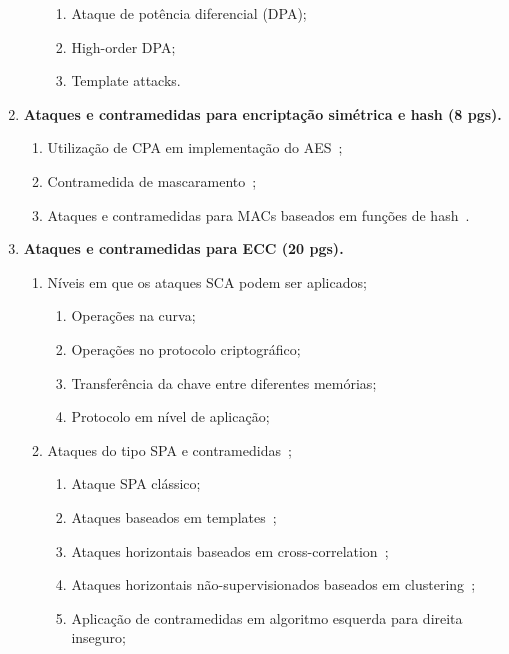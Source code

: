 \documentclass[12pt]{article}
\begin{document}
\begin{enumerate}
\begin{enumerate}
\begin{enumerate}
            \item Ataque de pot\^encia diferencial (DPA);
            \item High-order DPA;
            \item Template attacks.
        \end{enumerate}
    \end{enumerate}
\item \textbf{Ataques e contramedidas para encripta\c{c}\~ao sim\'etrica e hash (8 pgs).}
    \begin{enumerate}
        \item Utiliza\c{c}\~ao de CPA em implementa\c{c}\~ao do AES~\cite{SCABook_Mangard2007};
        \item Contramedida de mascaramento~\cite{SCABook_Mangard2007};
        \item Ataques e contramedidas para MACs baseados em funções de hash~\cite{McEvoyTunstall07,BertoniDaemenAssche09}.
    \end{enumerate}
\item \textbf{Ataques e contramedidas para ECC (20 pgs).}
    \begin{enumerate}
        \item N\'iveis em que os ataques SCA podem ser aplicados;
        \begin{enumerate}
            \item Opera\c{c}\~oes na curva;
            \item Opera\c{c}\~oes no protocolo criptogr\'afico;
            \item Transfer\^encia da chave entre diferentes mem\'orias;
            \item Protocolo em n\'ivel de aplica\c{c}\~ao;
        \end{enumerate}
        \item Ataques do tipo SPA e contramedidas~\cite{danger2013synthesis};
        \begin{enumerate}
            \item Ataque SPA clássico;
            \item Ataques baseados em templates~\cite{medwed2008template};
            \item Ataques horizontais baseados em cross-correlation~\cite{witteman2011defeating};
            \item Ataques horizontais não-supervisionados baseados em clustering~\cite{heyszl2013clustering, perin2015semi};
            \item Aplica\c{c}\~ao de contramedidas em algoritmo esquerda para direita inseguro;

\end{enumerate}
\end{enumerate}
\end{enumerate}
\end{document}
